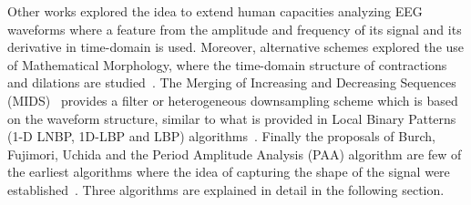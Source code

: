 Other works explored the idea to extend human capacities analyzing EEG waveforms \cite{Klein1976} where a feature from the amplitude and frequency of its signal and its derivative in time-domain is used.  Moreover, alternative schemes explored the use of Mathematical Morphology, where the time-domain structure of contractions and dilations are studied~\cite{Yamaguchi2009}. The Merging of Increasing and Decreasing Sequences (MIDS)~\cite{Zhang2013} provides a filter or heterogeneous downsampling scheme which is based on the waveform structure, similar to what is provided in Local Binary Patterns  (1-D LNBP, 1D-LBP and LBP) algorithms~\cite{Jaiswal2017}.  Finally the proposals of Burch, Fujimori, Uchida and the Period Amplitude Analysis (PAA) algorithm are few of the earliest algorithms where the idea of capturing the shape of the signal were established~\cite{Uchida1996}.  Three algorithms are explained in detail in the following section.



%
%
%
%
%
%
%
%
%
%


